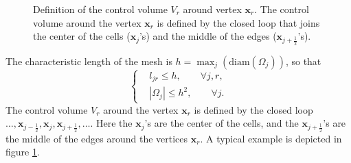 \documentclass[a4paper,french,english,10pt]{article}
\begin{document}
 \begin{figure}[h!]
 \begin{center}
 \end{center}
 \caption{Definition of the control volume $V_r$ around
 vertex $\mathbf{x}_r$.
 The control volume  around the vertex $\mathbf{x}_r$
 is defined by the closed loop
 that joins the center of the cells ($\mathbf{x}_j$'s) and the middle
 of the edges ($\mathbf{x}_{j+\frac12}$'s).}
 \label{figcv}
 \end{figure}


The characteristic length of the mesh is 
$h=\max_j \left( \mbox{diam}(\Omega_j)  \right)$,
so that 
\begin{equation} \label{eq:d7}
\left\{
\begin{aligned}
&l_{jr}\leq h , \qquad \forall j,r , \\
&|\Omega_j| \leq  h^2 , \qquad \forall j .
\end{aligned}
\right. 
\end{equation}
The control volume $V_r$ 
around the vertex $\mathbf x_r$ is 
defined by the closed loop
$
\dots, \mathbf{x}_{j-\frac12}, \mathbf{x}_j,\mathbf{x}_{j+\frac12},\dots$.
Here  the $\mathbf{x}_j$'s are the center of the cells, and the 
$\mathbf{x}_{j+\frac12}$'s are the middle of the edges around the vertices
$\mathbf{x}_r$.
A typical example is depicted in  figure \ref{figcv}. 
\end{document}
